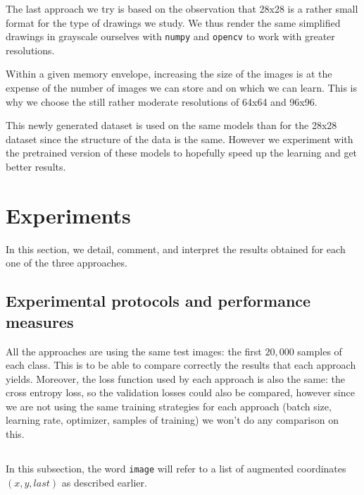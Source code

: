 \documentclass[10pt,twocolumn,letterpaper]{article}
\begin{document}
The last approach we try is based on the observation that 28x28 is a rather small format for the type of drawings we study. We thus render the same simplified drawings in grayscale ourselves with \texttt{numpy} and \texttt{opencv} to work with greater resolutions.

Within a given memory envelope, increasing the size of the images is at the expense of the number of images we can store and on which we can learn. This is why we choose the still rather moderate resolutions of 64x64 and 96x96.

This newly generated dataset is used on the same models than for the 28x28 dataset since the structure of the data is the same. However we experiment with the pretrained version of these models to hopefully speed up the learning and get better results.

\section{Experiments}

In this section, we detail, comment, and interpret the results obtained for each one of the three approaches.

\subsection{Experimental protocols and performance measures}

All the approaches are using the same test images: the first $20,000$ samples of each class. This is to be able to compare correctly the results that each approach yields. Moreover, the loss function used by each approach is also the same: the cross entropy loss, so the validation losses could also be compared, however since we are not using the same training strategies for each approach (batch size, learning rate, optimizer, samples of training) we won't do any comparison on this.

\subsection{\rnnTitle{}}

In this subsection, the word \texttt{image} will refer to a list of augmented coordinates $(x, y, last)$ as described earlier.
\end{document}
